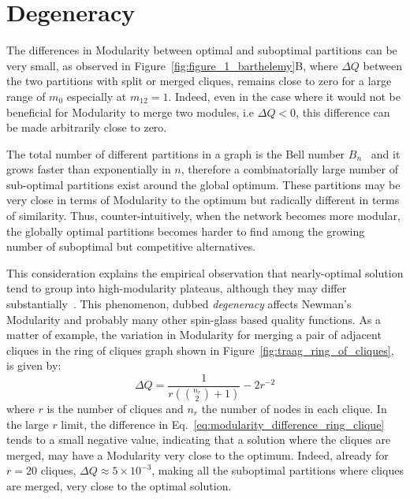 \section{Degeneracy}\label{sec:degeneracy}
The differences in Modularity between optimal and suboptimal partitions can be very small, as observed in Figure~\ref{fig:figure_1_barthelemy}B, where $\Delta Q$ between the two partitions with split or merged cliques, remains close to zero for a large range of $m_0$ especially at $m_{12}=1$.
Indeed, even in the case where it would not be beneficial for Modularity to merge two modules, i.e $\Delta Q <0$, this difference can be made arbitrarily close to zero.

The total number of different partitions in a graph is the Bell number $B_n$~\cite{stanley1997} and it grows faster than exponentially in $n$, therefore a combinatorially large number of sub-optimal partitions exist around the global optimum. These partitions may be very close in terms of Modularity to the optimum but radically different in terms of similarity.
Thus, counter-intuitively, when the network becomes more modular, the globally optimal partitions becomes harder to find among the growing number of suboptimal but competitive alternatives.

This consideration explains the empirical observation that nearly-optimal solution tend to group into high-modularity plateaus, although they may differ substantially~\cite{good2009}. This phenomenon, dubbed \emph{degeneracy} affects Newman's Modularity and probably many other spin-glass based quality functions.
As a matter of example, the variation in Modularity for merging a pair of adjacent cliques in the ring of cliques graph shown in Figure~\ref{fig:traag_ring_of_cliques}, is given by:
\begin{equation}\label{eq:modularity_difference_ring_clique}
\Delta Q = \frac{1}{r\left(\binom{n_r}{2}+1\right)}-2r^{-2}
\end{equation}
where $r$ is the number of cliques and $n_r$ the number of nodes in each clique.
In the large $r$ limit, the difference in Eq.~\ref{eq:modularity_difference_ring_clique} tends to a small negative value, indicating that a solution where the cliques are merged, may have a Modularity very close to the optimum. Indeed, already for $r=20$ cliques, $\Delta Q \approx 5\times 10^{-3}$, making all the suboptimal partitions where cliques are merged, very close to the optimal solution.

